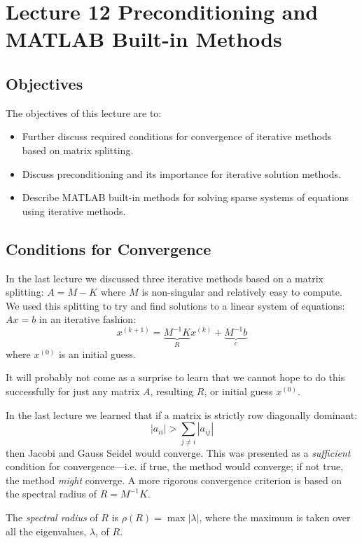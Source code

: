 \chapter{Lecture 12 Preconditioning and MATLAB Built-in Methods}
\label{ch:lec12n}
\section{Objectives}
The objectives of this lecture are to:
\begin{itemize}
\item Further discuss required conditions for convergence of iterative methods based on matrix splitting.
\item Discuss preconditioning and its importance for iterative solution methods.
\item Describe MATLAB built-in methods for solving sparse systems of equations using iterative methods.
\end{itemize}
\setcounter{lstannotation}{0}

\section{Conditions for Convergence}
In the last lecture we discussed three iterative methods based on a matrix splitting: $A = M-K$ where $M$ is non-singular and relatively easy to compute.  We used this splitting to try and find solutions to a linear system of equations: $Ax = b$ in an iterative fashion:
\begin{equation*}
x^{(k+1)} = \underbrace{M^{-1}K}_{R}x^{(k)} + \underbrace{M^{-1}b}_{c}
\end{equation*}
where $x^{(0)}$ is an initial guess.

It will probably not come as a surprise to learn that we cannot hope to do this successfully for just any matrix $A$, resulting $R$, or initial guess $x^{(0)}$.

In the last lecture we learned that if a matrix is strictly row diagonally dominant:
\begin{equation*}
|a_{ii}| > \sum\limits_{j \ne i} |a_{ij}|
\end{equation*}
then Jacobi and Gauss Seidel would converge.  This was presented as a \emph{sufficient} condition for convergence---i.e. if true, the method would converge; if not true, the method \emph{might} converge.  A more rigorous convergence criterion is based on the spectral radius of $R = M^{-1}K$.\cite{demmel1997applied}

\begin{definition}
The \emph{spectral radius} of $R$ is $\rho(R) = \max{|\lambda|}$, where the maximum is taken over all the eigenvalues, $\lambda$, of $R$.
\end{definition} 

